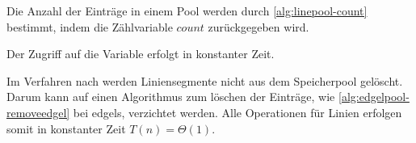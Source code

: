 Die Anzahl der Einträge in einem Pool werden durch \autoref{alg:linepool-count} bestimmt, indem die Zählvariable
 $\mathit{count}$ zurückgegeben wird.

Der Zugriff auf die Variable erfolgt in konstanter Zeit.

Im Verfahren nach \citeauthor{clarke96} werden Liniensegmente nicht aus dem Speicherpool gelöscht. Darum kann auf
 einen Algorithmus zum löschen der Einträge, wie \autoref{alg:edgelpool-removeedgel} bei \glspl{edgel}, verzichtet
 werden. Alle Operationen für Linien erfolgen somit in konstanter Zeit $T(n) = \Theta(1)$.


